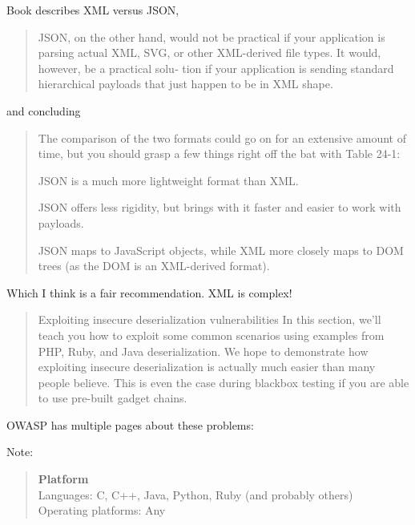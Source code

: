 \documentclass[Screen16to9,17pt]{foils}
\begin{document}

Book describes XML versus JSON,

\begin{quote}\small
JSON, on the other hand, would not be practical if your application is parsing actual
XML, SVG, or other XML-derived file types. It would, however, be a practical solu‐
tion if your application is sending standard hierarchical payloads that just happen to
be in XML shape.
\end{quote}

and concluding
\begin{quote}\small
The comparison of the two formats could go on for an extensive amount of time, but
you should grasp a few things right off the bat with Table 24-1:
\begin{list2}
\item JSON is a much more lightweight format than XML.
\item JSON offers less rigidity, but brings with it faster and easier to work with
payloads.
\item JSON maps to JavaScript objects, while XML more closely maps to DOM trees
(as the DOM is an XML-derived format).
\end{list2}
\end{quote}

Which I think is a fair recommendation. XML is complex!



\begin{quote}
Exploiting insecure deserialization vulnerabilities
In this section, we'll teach you how to exploit some common scenarios using examples from PHP, Ruby, and Java deserialization. We hope to demonstrate how exploiting insecure deserialization is actually much easier than many people believe. This is even the case during blackbox testing if you are able to use pre-built gadget chains.
\end{quote}



\begin{list2}
    \item OWASP has multiple pages about these problems:\\
\item Note:
\begin{quote}{\bf
Platform}\\
Languages: C, C++, Java, Python, Ruby (and probably others)\\
Operating platforms: Any
\end{quote}
\end{list2}





\slidenext{}
\end{document}
